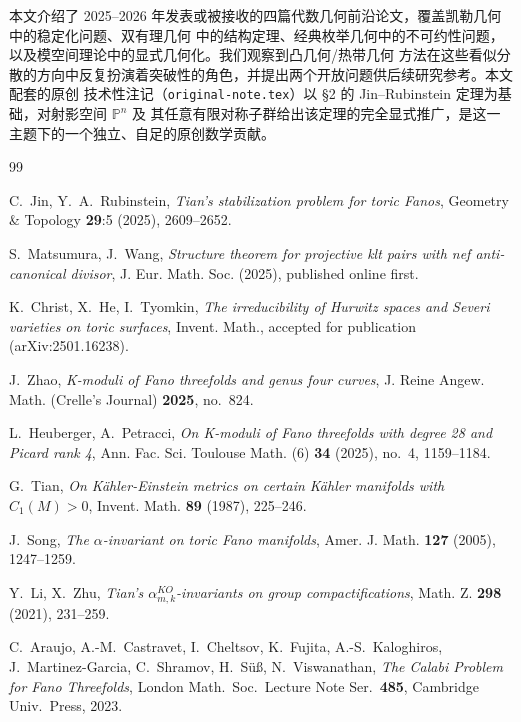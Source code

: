 \documentclass[11pt,a4paper]{article}
\theoremstyle{definition}
\theoremstyle{remark}
\newcommand{\PP}{\mathbb{P}}
\begin{document}
本文介绍了 2025--2026 年发表或被接收的四篇代数几何前沿论文，覆盖凯勒几何中的稳定化问题、双有理几何
中的结构定理、经典枚举几何中的不可约性问题，以及模空间理论中的显式几何化。我们观察到凸几何/热带几何
方法在这些看似分散的方向中反复扮演着突破性的角色，并提出两个开放问题供后续研究参考。本文配套的原创
技术性注记（\texttt{original-note.tex}）以 \S 2 的 Jin--Rubinstein 定理为基础，对射影空间 $\PP^n$ 及
其任意有限对称子群给出该定理的完全显式推广，是这一主题下的一个独立、自足的原创数学贡献。

\begin{thebibliography}{99}

 C.\ Jin, Y.\ A.\ Rubinstein, \emph{Tian's stabilization problem for toric Fanos},
Geometry \& Topology \textbf{29}:5 (2025), 2609--2652.

 S.\ Matsumura, J.\ Wang, \emph{Structure theorem for projective klt pairs with nef
anti-canonical divisor}, J. Eur. Math. Soc. (2025), published online first.

 K.\ Christ, X.\ He, I.\ Tyomkin, \emph{The irreducibility of Hurwitz spaces and Severi
varieties on toric surfaces}, Invent. Math., accepted for publication (arXiv:2501.16238).

 J.\ Zhao, \emph{K-moduli of Fano threefolds and genus four curves},
J. Reine Angew. Math. (Crelle's Journal) \textbf{2025}, no.\ 824.

 L.\ Heuberger, A.\ Petracci, \emph{On K-moduli of Fano threefolds with degree 28 and
Picard rank 4}, Ann. Fac. Sci. Toulouse Math. (6) \textbf{34} (2025), no.\ 4, 1159--1184.

 G.\ Tian, \emph{On Kähler-Einstein metrics on certain Kähler manifolds with
$C_1(M)>0$}, Invent. Math. \textbf{89} (1987), 225--246.

 J.\ Song, \emph{The $\alpha$-invariant on toric Fano manifolds}, Amer. J. Math.
\textbf{127} (2005), 1247--1259.

 Y.\ Li, X.\ Zhu, \emph{Tian's $\alpha_{m,k}^{KO}$-invariants on group compactifications},
Math. Z. \textbf{298} (2021), 231--259.

 C.\ Araujo, A.-M.\ Castravet, I.\ Cheltsov, K.\ Fujita, A.-S.\ Kaloghiros,
J.\ Martinez-Garcia, C.\ Shramov, H.\ Süß, N.\ Viswanathan, \emph{The Calabi Problem for Fano
Threefolds}, London Math.\ Soc.\ Lecture Note Ser.\ \textbf{485}, Cambridge Univ.\ Press, 2023.

\end{thebibliography}
\end{document}
